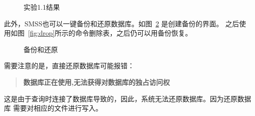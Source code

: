 \documentclass[a4paper,twoside]{article}
\begin{document}
\begin{spacing}{1.2}
\begin{figure}[htbp]
    \centering
    \caption{实验1.1结果}
    \label{fig:1}
\end{figure}

此外，SMSS也可以一键备份和还原数据库。如图~\ref{fig:backup}
是创建备份的界面。
之后使用如图~\ref{fig:drop}所示的命令删除表，之后仍可以用备份恢复。
\begin{figure}[htbp]
    \centering
    \caption{备份和还原}
    \label{fig:backup}
\end{figure}

需要注意的是，直接还原数据库可能报错：
\begin{quotation}
\textbf{数据库正在使用,无法获得对数据库的独占访问权}
\end{quotation}
这是由于查询时连接了数据库导致的，因此，系统无法还原数据库。因为还原数据库
需要对相应的文件进行写入。


\end{spacing}
\end{document}

